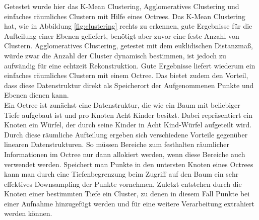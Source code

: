 Getestet wurde hier das K-Mean Clustering, Agglomeratives Clustering und einfaches räumliches Clustern mit Hilfe eines Octrees. Das K-Mean Clustering hat, wie in Abbildung \ref{fig:clustering} rechts zu erkennen, gute Ergebnisse für die Aufteilung einer Ebenen geliefert, benötigt aber zuvor eine feste Anzahl von Clustern. Agglomeratives Clustering, getestet mit dem euklidischen Distanzmaß, würde zwar die Anzahl der Cluster dynamisch bestimmen, ist jedoch zu aufwändig für eine echtzeit Rekonstruktion. Gute Ergebnisse liefert wiederum ein einfaches räumliches Clustern mit einem Octree. Das bietet zudem den Vorteil, dass diese Datenstruktur direkt als Speicherort der Aufgenommenen Punkte und Ebenen dienen kann. \\

Ein Octree ist zunächst eine Datenstruktur, die wie ein Baum mit beliebiger Tiefe aufgebaut ist und pro Knoten Acht Kinder besitzt. Dabei repräsentiert ein Knoten ein Würfel, der durch seine Kinder in Acht Kind-Würfel aufgeteilt wird. Durch diese räumliche Aufteilung ergeben sich verschiedene Vorteile gegenüber linearen Datenstrukturen. So müssen Bereiche zum festhalten räumlicher Informationen im Octree nur dann allokiert werden, wenn diese Bereiche auch verwendet werden. Speichert man Punkte in den untersten Knoten eines Octrees kann man durch eine Tiefenbegrenzung beim Zugriff auf den Baum ein sehr effektives Downsampling der Punkte vornehmen. Zuletzt entstehen durch die Knoten einer bestimmten Tiefe ein Cluster, zu denen in diesem Fall Punkte bei einer Aufnahme hinzugefügt werden und für eine weitere Verarbeitung extrahiert werden können.\\

